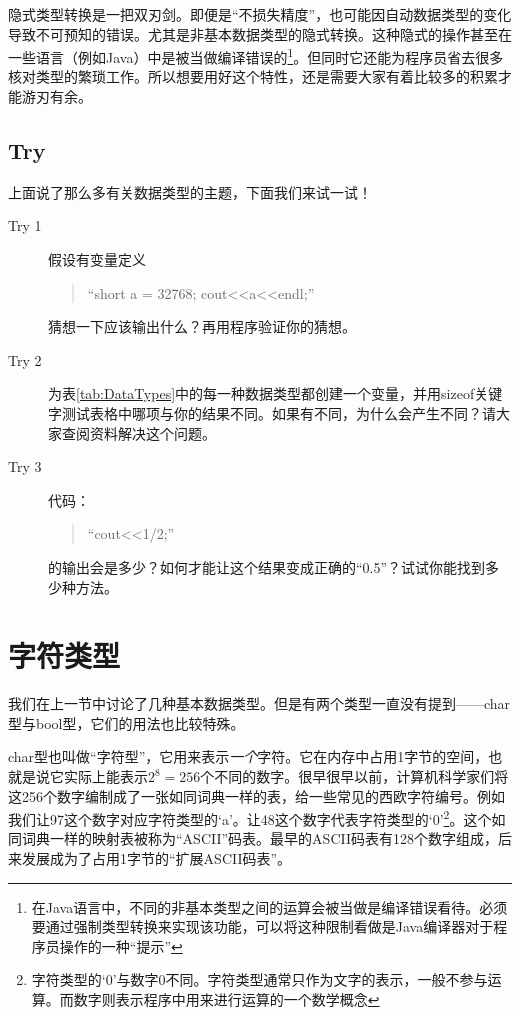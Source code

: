 隐式类型转换是一把双刃剑。即便是“不损失精度”，也可能因自动数据类型的变化导致不可预知的错误。尤其是非基本数据类型的隐式转换。这种隐式的操作甚至在一些语言（例如Java）中是被当做编译错误的\footnote{在Java语言中，不同的非基本类型之间的运算会被当做是编译错误看待。必须要通过强制类型转换来实现该功能，可以将这种限制看做是Java编译器对于程序员操作的一种“提示”}。但同时它还能为程序员省去很多核对类型的繁琐工作。所以想要用好这个特性，还是需要大家有着比较多的积累才能游刃有余。

\subsection{Try}

上面说了那么多有关数据类型的主题，下面我们来试一试！

\begin{description}
	\item[Try 1] 
		假设有变量定义
		\begin{quote}“short a = 32768; cout<<a<<endl;”\end{quote}
		猜想一下应该输出什么？再用程序验证你的猜想。
	\item[Try 2] 
		为表\ref{tab:DataTypes}中的每一种数据类型都创建一个变量，并用sizeof关键字测试表格中哪项与你的结果不同。如果有不同，为什么会产生不同？请大家查阅资料解决这个问题。
	\item[Try 3] 
		代码：
		\begin{quote}“cout<<1/2;” \end{quote}
		的输出会是多少？如何才能让这个结果变成正确的“0.5”？试试你能找到多少种方法。
\end{description}

\section{字符类型}
我们在上一节中讨论了几种基本数据类型。但是有两个类型一直没有提到——char型与bool型，它们的用法也比较特殊。

char型也叫做“字符型”，它用来表示\emph{一个}字符。它在内存中占用1字节的空间，也就是说它实际上能表示$2^8=256$个不同的数字。很早很早以前，计算机科学家们将这256个数字编制成了一张如同词典一样的表，给一些常见的西欧字符编号。例如我们让97这个数字对应字符类型的‘a’。让48这个数字代表字符类型的‘0’\footnote{字符类型的‘0’与数字0不同。字符类型通常只作为文字的表示，一般不参与运算。而数字则表示程序中用来进行运算的一个数学概念}。这个如同词典一样的映射表被称为“ASCII”码表。最早的ASCII码表有128个数字组成，后来发展成为了占用1字节的“扩展ASCII码表”。

